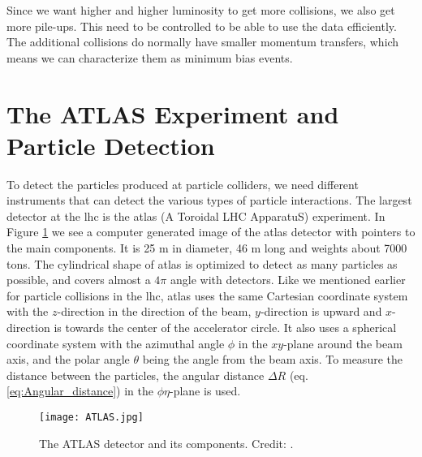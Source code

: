 \documentclass[a4paper, american, 12pt]{report}
\begin{document}
	Since we want higher and higher luminosity to get more collisions, we also get more pile-ups. This need to be controlled to be able to use the data efficiently. The additional collisions do normally have smaller momentum transfers, which means we can characterize them as minimum bias events.
	

	\section{The ATLAS Experiment and Particle Detection} 
	\label{sect:Theory-ATLAS}
	To detect the particles produced at particle colliders, we need different instruments that can detect the various types of particle interactions. The largest detector at the \acrshort{lhc} is the \acrshort{atlas} (A Toroidal LHC ApparatuS) experiment. In Figure \ref{fig:ATLASdetector} we see a computer generated image of the \acrshort{atlas} detector with pointers to the main components. It is 25 m in diameter, 46 m long and weights about 7000 tons. The cylindrical shape of \acrshort{atlas} is optimized to detect as many particles as possible, and covers almost a $4\pi$ angle with detectors. Like we mentioned earlier for particle collisions in the \acrshort{lhc}, \acrshort{atlas} uses the same Cartesian coordinate system with the $z$-direction in the direction of the beam, $y$-direction is upward and $x$-direction is towards the center of the accelerator circle. It also uses a spherical coordinate system with the azimuthal angle $\phi$ in the $xy$-plane around the beam axis, and the polar angle $\theta$ being the angle from the beam axis. To measure the distance between the particles, the angular distance $\Delta R$ (eq.\ref{eq:Angular_distance}) in the $\phi\eta$-plane is used.
	
	\begin{figure}[h!]
		\hspace*{-1.2cm}
		\centering\texttt{[image: ATLAS.jpg]}
		\caption[The ATLAS detector components.]{The ATLAS detector and its components. Credit: \citet{ATLASdetector}.\label{fig:ATLASdetector}}
	\end{figure}  
	
\end{document}
